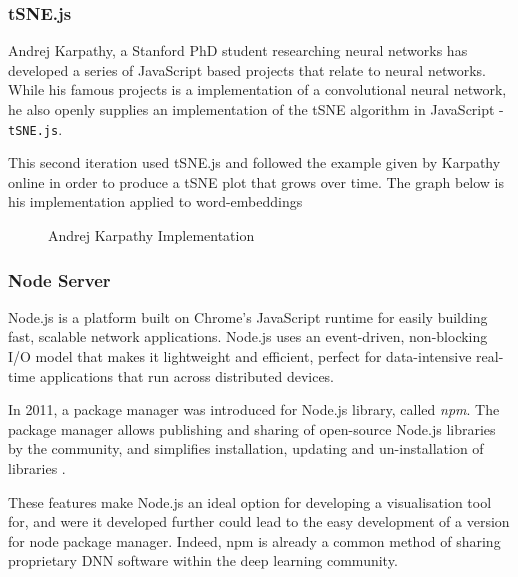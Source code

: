 \documentclass[a4paper,11pt,titlepage]{article}
\begin{document}
		\subsubsection{tSNE.js}
		Andrej Karpathy, a Stanford PhD student researching neural networks has developed a series of JavaScript based projects that relate to neural networks. While his famous projects is a implementation of a convolutional neural network, he also openly supplies an implementation of the tSNE algorithm in JavaScript - \texttt{tSNE.js}.
		\par 
		This second iteration used tSNE.js and followed the example given by Karpathy online in order to produce a tSNE plot that grows over time. The graph below is his implementation applied to word-embeddings \cite{karpathy} 
		
	\begin{figure}[H]
    			\caption{Andrej Karpathy Implementation}%
	\end{figure}	
		
	\subsubsection{Node Server}
		Node.js is a platform built on Chrome's JavaScript runtime for easily building fast, scalable network applications. Node.js uses an event-driven, non-blocking I/O model that makes it lightweight and efficient, perfect for data-intensive real-time applications that run across distributed devices.\cite{Dahl2009}
		\par 
		In 2011, a package manager was introduced for Node.js library, called \textit{npm}. The package manager allows publishing and sharing of open-source Node.js libraries by the community, and simplifies installation, updating and un-installation of libraries \cite{Dahl2009}.
		\par 
		These features make Node.js an ideal option for developing a visualisation tool for, and were it developed further could lead to the easy development of a version for node package manager. Indeed, npm is already a common method of sharing proprietary DNN software within the deep learning community.
		 
\end{document}
